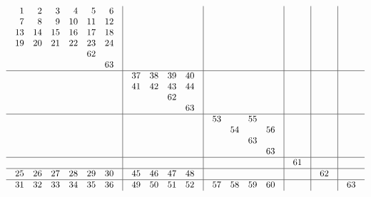 \documentclass[12pt,a4paper]{amsart}
\begin{document}
\begin{align*}
  \begin{array}{c|c|c|c|c|c}
\begin{array}{rrrrrr}%
1&2&3&4&5&6\\%
7&8&9&10&11&12\\%
13&14&15&16&17&18\\%
19&20&21&22&23&24\\%
  &  &  &  &62&  \\%
  &  &  &  &  &63\\%
\end{array}%
&&&&& \\\hline
&
\begin{array}{rrrr}%
37&38&39&40\\%
41&42&43&44\\%
  &  &62&  \\%
  &  &  &63\\%
\end{array}%
&&&& \\\hline
&&
\begin{array}{rrrr}%
53&  &55&  \\%
  &54&  &56\\%
  &  &63&  \\%
  &  &  &63\\%
\end{array}%
&&& \\\hline
&&&
\begin{array}{r}%
61\\%
\end{array}%
&& \\\hline
\begin{array}{rrrrrr}%
25&26&27&28&29&30\\%
\end{array}%
&
\begin{array}{rrrr}%
45&46&47&48\\%
\end{array}%
&&&
\begin{array}{r}%
62\\%
\end{array}%
& \\\hline
\begin{array}{rrrrrr}%
31&32&33&34&35&36\\%
\end{array}%
&
\begin{array}{rrrr}%
49&50&51&52\\%
\end{array}%
&
\begin{array}{rrrr}%
{57}&{58}&{59}&{60}\\%
\end{array}%
&&&
\begin{array}{r}%
63\\%
\end{array}%
\end{array}
\end{align*}
\end{document}
